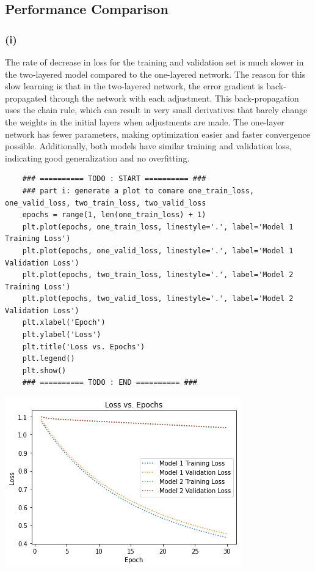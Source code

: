 \documentclass[11pt]{article}
\newcommand{\sol}[1]{{\bf{\color{magenta}{{Solution:}}}}}
\begin{document}
\subsection{Performance Comparison}

\subsubsection*{(i)}
\sol x The rate of decrease in loss for the training and validation set is much slower in the two-layered model compared to the one-layered network. The reason for this slow learning is that in the two-layered network, the error gradient is back-propagated through the network with each adjustment. This back-propagation uses the chain rule, which can result in very small derivatives that barely change the weights in the initial layers when adjustments are made. The one-layer network has fewer parameters, making optimization easier and faster convergence possible. Additionally, both models have similar training and validation loss, indicating good generalization and no overfitting. \\

\begin{lstlisting}
    ### ========== TODO : START ========== ###
    ### part i: generate a plot to comare one_train_loss, one_valid_loss, two_train_loss, two_valid_loss
    epochs = range(1, len(one_train_loss) + 1)
    plt.plot(epochs, one_train_loss, linestyle='.', label='Model 1 Training Loss')
    plt.plot(epochs, one_valid_loss, linestyle='.', label='Model 1 Validation Loss')
    plt.plot(epochs, two_train_loss, linestyle='.', label='Model 2 Training Loss')
    plt.plot(epochs, two_valid_loss, linestyle='.', label='Model 2 Validation Loss')
    plt.xlabel('Epoch')
    plt.ylabel('Loss')
    plt.title('Loss vs. Epochs')
    plt.legend()
    plt.show()
    ### ========== TODO : END ========== ###
\end{lstlisting}

\begin{center}
    \includegraphics[scale=0.6]{4i.png} \\
\end{center}
\end{document}
